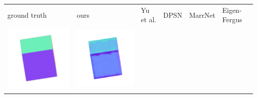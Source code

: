 \begin{tabularx}{\linewidth}{@{}Y@{}Y@{}Y@{}Y@{}Y@{}Y@{}}
ground truth & ours & Yu et al. & DPSN & MarrNet & Eigen-Fergus \\
\includegraphics[width=\linewidth]{semisynthetic/20160617_0_gt.png} &
\includegraphics[width=\linewidth]{semisynthetic/20160617_0_ours_out.png} &

\end{tabularx}
